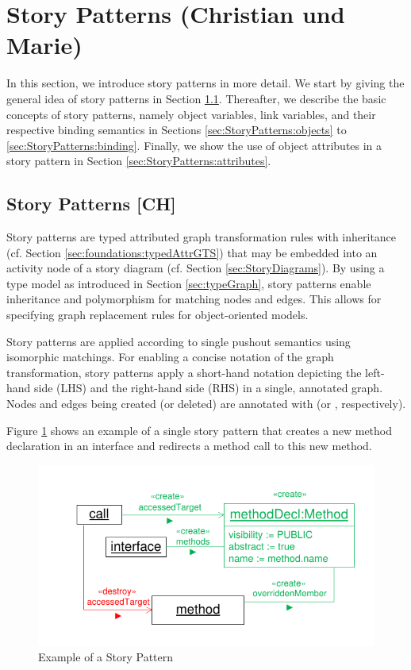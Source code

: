 \section{Story Patterns (Christian und Marie)} \label{sec:StoryPatterns}

In this section, we introduce story patterns in more detail.
We start by giving the general idea of story patterns in Section \ref{sec:StoryPatterns:storyPattern}.
Thereafter, we describe the basic concepts of story patterns, namely object variables, link variables,
and their respective binding semantics in Sections \ref{sec:StoryPatterns:objects} to \ref{sec:StoryPatterns:binding}.
Finally, we show the use of object attributes in a story pattern in Section \ref{sec:StoryPatterns:attributes}.


\subsection{Story Patterns [CH]}
\label{sec:StoryPatterns:storyPattern}

Story patterns are typed attributed graph transformation rules with inheritance (cf. Section \ref{sec:foundations:typedAttrGTS}) that may be embedded into an activity node of a story diagram (cf. Section \ref{sec:StoryDiagrams}). By using a type model as introduced in Section \ref{sec:typeGraph}, story patterns enable inheritance and polymorphism for matching nodes and edges.
This allows for specifying graph replacement rules for object-oriented models.

Story patterns are applied according to single pushout semantics using isomorphic matchings.
For enabling a concise notation of the graph transformation, story patterns apply a short-hand notation depicting the left-hand side (LHS) and the right-hand side (RHS) in a single, annotated graph. Nodes and edges being created (or deleted) are annotated with \create (or  \destroy, respectively).

Figure \ref{fig:simpleStoryPattern} shows an example of a single story pattern that creates a new method declaration in an interface and redirects a method call to this new method.

\begin{figure}[htbp]
  \centering
  \includegraphics[scale=1.0]{figures/SimpleStoryPattern}
  \caption{Example of a Story Pattern}
  \label{fig:simpleStoryPattern}
\end{figure}

